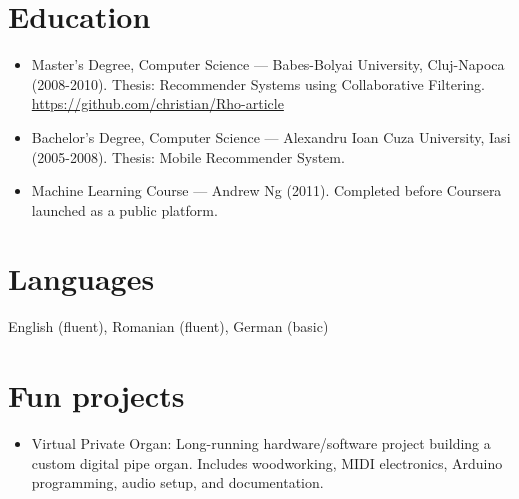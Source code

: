 \documentclass[11pt,a4paper]{article}
\begin{document}
\section*{Education}
\begin{itemize}
  \item Master's Degree, Computer Science --- Babes-Bolyai University, Cluj-Napoca (2008-2010). Thesis: Recommender Systems using Collaborative Filtering. \href{https://github.com/christian/Rho-article}{https://github.com/christian/Rho-article}
  \item Bachelor's Degree, Computer Science --- Alexandru Ioan Cuza University, Iasi (2005-2008). Thesis: Mobile Recommender System.
  \item Machine Learning Course --- Andrew Ng (2011). Completed before Coursera launched as a public platform.
\end{itemize}

\section*{Languages}
English (fluent), Romanian (fluent), German (basic)

\section*{Fun projects}
\begin{itemize}
  \item Virtual Private Organ: Long-running hardware/software project building a custom digital pipe organ. Includes woodworking, MIDI electronics, Arduino programming, audio setup, and documentation.
\end{itemize}
\end{document}
